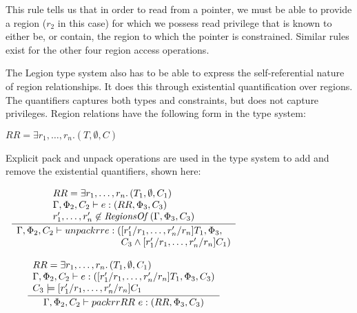 This rule tells us that in order to read from a pointer, we must be able to
provide a region ($r_2$ in this case) for which we possess read privilege that 
is known to either be, or contain, the region to which the pointer is
constrained.  Similar rules exist for the other four region access operations.

The Legion type system also has to be able to express the self-referential
nature of region relationships.  It does this through existential quantification
over regions.  The quantifiers captures both types and constraints, but does
not capture privileges.  Region relations have the following form in the
type system:

\begin{center}
$RR = \exists r_1, \ldots, r_n.\left(T, \emptyset, C\right)$
\end{center}

Explicit pack and unpack operations are used in the type system
to add and remove the existential quantifiers, shown here:

\begin{center}
\begin{math}
\begin{array}{c}
\infrule{
\begin{array}{l}
RR = \exists r_1, \ldots, r_n.\left(T_1, \emptyset, C_1\right) \\
\Gamma, \Phi_2, C_2 \vdash e : \left(RR, \Phi_3, C_3\right) \\
r'_1, \ldots, r'_n \not\in \mathit{RegionsOf}\left(\Gamma, \Phi_3, C_3\right)
\end{array}
}{
\begin{array}{l@{}l}
\Gamma, \Phi_2, C_2 \vdash unpackrr{ }e : ( & [r'_1/r_1,\ldots,r'_n/r_n]T_1, \Phi_3, \\
& C_3 \wedge [r'_1/r_1,\ldots,r'_n/r_n]C_1)
\end{array}
}
\\
\\
\infrule{
\begin{array}{l}
RR = \exists r_1, \ldots, r_n.\left(T_1, \emptyset, C_1\right) \\
\Gamma, \Phi_2, C_2 \vdash e : \left([r'_1/r_1,\ldots,r'_n/r_n]T_1, \Phi_3, C_3\right) \\
C_3 \models [r'_1/r_1,\ldots,r'_n/r_n]C_1
\end{array}
}{
\begin{array}{l}
\Gamma, \Phi_2, C_2 \vdash packrr{ }RR\mbox{ }e : \left(RR, \Phi_3, C_3\right) \\
\end{array}
}
\end{array}
\end{math}
\end{center}

